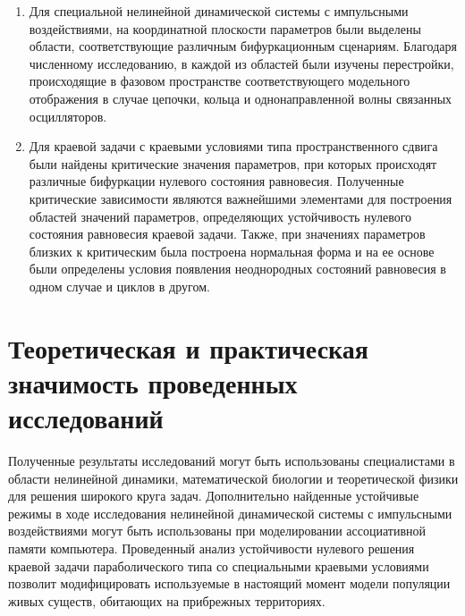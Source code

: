 \documentclass[12pt]{extarticle}
\begin{document}
\begin{enumerate}[label=\arabic*),leftmargin=1.5\parindent]
\item Для специальной нелинейной динамической системы с импульсными воздействиями, на координатной плоскости параметров были выделены области, соответствующие различным бифуркационным сценариям. Благодаря численному исследованию, в каждой из областей были изучены  перестройки, происходящие в фазовом пространстве соответствующего модельного отображения в случае цепочки, кольца и однонаправленной волны связанных осцилляторов.
\item Для краевой задачи с краевыми условиями типа пространственного сдвига были найдены критические значения параметров, при которых происходят различные бифуркации нулевого состояния равновесия. Полученные критические зависимости являются важнейшими элементами для построения областей значений параметров, определяющих устойчивость нулевого состояния равновесия краевой задачи. Также, при значениях параметров близких к критическим была построена нормальная форма и на ее основе были определены условия появления неоднородных состояний равновесия в одном случае и циклов в другом. 
\end{enumerate}

\hspace{0cm}

\hspace{0cm}

\hspace{0cm}

\section*{Теоретическая и практическая значимость проведенных исследований}

\hspace{0cm}

\hspace{0cm}

\hspace{0cm}

Полученные результаты исследований могут быть использованы специалистами в области нелинейной динамики, математической биологии и теоретической физики для решения широкого круга задач. Дополнительно найденные устойчивые режимы в ходе исследования нелинейной динамической системы с импульсными воздействиями могут быть использованы при моделировании ассоциативной памяти компьютера. Проведенный анализ устойчивости нулевого решения краевой задачи параболического типа со специальными краевыми условиями позволит модифицировать используемые в настоящий момент модели популяции живых существ, обитающих на прибрежных территориях.
\end{document}
